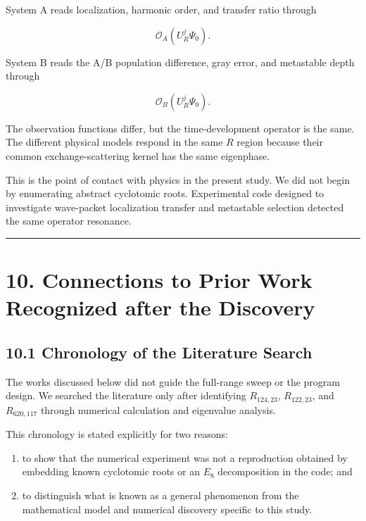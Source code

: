 \documentclass[
  10pt,
  a4paper,
]{article}
\providecommand{\tightlist}{%
  \setlength{\itemsep}{0pt}\setlength{\parskip}{0pt}}
\begin{document}
System A reads localization, harmonic order, and transfer ratio through

\[
\mathcal O_A(U_R^j\Psi_0).
\]

System B reads the A/B population difference, gray error, and metastable
depth through

\[
\mathcal O_B(U_R^j\Psi_0).
\]

The observation functions differ, but the time-development operator is
the same. The different physical models respond in the same \(R\) region
because their common exchange-scattering kernel has the same eigenphase.

This is the point of contact with physics in the present study. We did
not begin by enumerating abstract cyclotomic roots. Experimental code
designed to investigate wave-packet localization transfer and metastable
selection detected the same operator resonance.

\begin{center}\rule{0.5\linewidth}{0.5pt}\end{center}

\section{10. Connections to Prior Work Recognized after the
Discovery}\label{connections-to-prior-work-recognized-after-the-discovery}

\subsection{10.1 Chronology of the Literature
Search}\label{chronology-of-the-literature-search}

The works discussed below did not guide the full-range sweep or the
program design. We searched the literature only after identifying
\(R_{124,23}\), \(R_{122,23}\), and \(R_{620,117}\) through numerical
calculation and eigenvalue analysis.

This chronology is stated explicitly for two reasons:

\begin{enumerate}
\def\labelenumi{\arabic{enumi}.}
\tightlist
\item
  to show that the numerical experiment was not a reproduction obtained
  by embedding known cyclotomic roots or an \(E_8\) decomposition in the
  code; and
\item
  to distinguish what is known as a general phenomenon from the
  mathematical model and numerical discovery specific to this study.
\end{enumerate}
\end{document}
